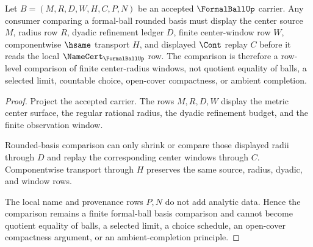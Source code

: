 \begin{theorem}
\label{thm:formalball-rounded-basis-comparison}
Let $B=(M,R,D,W,H,C,P,N)$ be an accepted $\FormalBallUp$ carrier. Any consumer comparing a formal-ball rounded basis must display the center source $M$, radius row $R$, dyadic refinement ledger $D$, finite center-window row $W$, componentwise $\hsame$ transport $H$, and displayed $\Cont$ replay $C$ before it reads the local $\NameCert_{\FormalBallUp}$ row. The comparison is therefore a row-level comparison of finite center-radius windows, not quotient equality of balls, a selected limit, countable choice, open-cover compactness, or ambient completion.
\end{theorem}
\begin{proof}
Project the accepted carrier. The rows $M,R,D,W$ display the metric center surface, the regular rational radius, the dyadic refinement budget, and the finite observation window.

Rounded-basis comparison can only shrink or compare those displayed radii through $D$ and replay the corresponding center windows through $C$. Componentwise transport through $H$ preserves the same source, radius, dyadic, and window rows.

The local name and provenance rows $P,N$ do not add analytic data. Hence the comparison remains a finite formal-ball basis comparison and cannot become quotient equality of balls, a selected limit, a choice schedule, an open-cover compactness argument, or an ambient-completion principle.
\end{proof}


